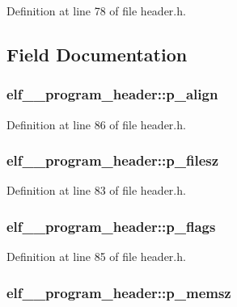 Definition at line 78 of file header.h.



\subsection{Field Documentation}
\hypertarget{structelf__32__program__header_a2a8ee61f9995f7be7f3fedf4b7ba12c6}{
\subsubsection[{p\_\-align}]{ {\bf elf\_\_\-program\_\-header::p\_\-align}}}
\label{structelf__32__program__header_a2a8ee61f9995f7be7f3fedf4b7ba12c6}


Definition at line 86 of file header.h.

\hypertarget{structelf__32__program__header_adea383271339e61d6dc701a292fd6596}{
\subsubsection[{p\_\-filesz}]{ {\bf elf\_\_\-program\_\-header::p\_\-filesz}}}
\label{structelf__32__program__header_adea383271339e61d6dc701a292fd6596}


Definition at line 83 of file header.h.

\hypertarget{structelf__32__program__header_a98c788bfdf95178f0e590c086002eaf9}{
\subsubsection[{p\_\-flags}]{ {\bf elf\_\_\-program\_\-header::p\_\-flags}}}
\label{structelf__32__program__header_a98c788bfdf95178f0e590c086002eaf9}


Definition at line 85 of file header.h.

\hypertarget{structelf__32__program__header_a9b8d565ea2d52584f038a437a7c714c7}{
\subsubsection[{p\_\-memsz}]{ {\bf elf\_\_\-program\_\-header::p\_\-memsz}}}
\label{structelf__32__program__header_a9b8d565ea2d52584f038a437a7c714c7}


